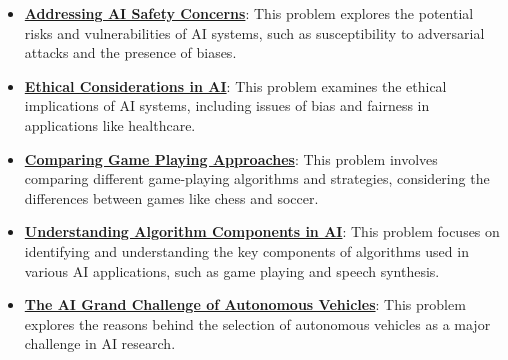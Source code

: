 \documentclass{article}%
\begin{document}
\begin{itemize}[leftmargin=*]
\item \href{\url{https://purdue.brightspace.com/d2l/common/assets/pdfjs-d2l-dist/1.0.14-legacy/web/viewer.html?file=\%252Fcontent\%252Fenforced\%252F1095467-wl.202510.CS.24300.001\%252F02L2-Intro.pdf\%253Fou\%253D1095467\&lang=en-us\&container=d2l-fileviewer-rendered-pdf\&fullscreen=d2l-fileviewer-rendered-pdf-dialog\&height=667}#page=19}{\textbf{Addressing AI Safety Concerns}}: This problem explores the potential risks and vulnerabilities of AI systems, such as susceptibility to adversarial attacks and the presence of biases.%
\item \href{\url{https://purdue.brightspace.com/d2l/common/assets/pdfjs-d2l-dist/1.0.14-legacy/web/viewer.html?file=\%252Fcontent\%252Fenforced\%252F1095467-wl.202510.CS.24300.001\%252F02L2-Intro.pdf\%253Fou\%253D1095467\&lang=en-us\&container=d2l-fileviewer-rendered-pdf\&fullscreen=d2l-fileviewer-rendered-pdf-dialog\&height=667}#page=20}{\textbf{Ethical Considerations in AI}}: This problem examines the ethical implications of AI systems, including issues of bias and fairness in applications like healthcare.%
\item \href{\url{https://purdue.brightspace.com/d2l/common/assets/pdfjs-d2l-dist/1.0.14-legacy/web/viewer.html?file=\%252Fcontent\%252Fenforced\%252F1095467-wl.202510.CS.24300.001\%252F02L2-Intro.pdf\%253Fou\%253D1095467\&lang=en-us\&container=d2l-fileviewer-rendered-pdf\&fullscreen=d2l-fileviewer-rendered-pdf-dialog\&height=667}#page=27}{\textbf{Comparing Game Playing Approaches}}: This problem involves comparing different game-playing algorithms and strategies, considering the differences between games like chess and soccer.%
\item \href{\url{https://purdue.brightspace.com/d2l/common/assets/pdfjs-d2l-dist/1.0.14-legacy/web/viewer.html?file=\%252Fcontent\%252Fenforced\%252F1095467-wl.202510.CS.24300.001\%252F02L2-Intro.pdf\%253Fou\%253D1095467\&lang=en-us\&container=d2l-fileviewer-rendered-pdf\&fullscreen=d2l-fileviewer-rendered-pdf-dialog\&height=667}#page=24}{\textbf{Understanding Algorithm Components in AI}}: This problem focuses on identifying and understanding the key components of algorithms used in various AI applications, such as game playing and speech synthesis.%
\item \href{\url{https://purdue.brightspace.com/d2l/common/assets/pdfjs-d2l-dist/1.0.14-legacy/web/viewer.html?file=\%252Fcontent\%252Fenforced\%252F1095467-wl.202510.CS.24300.001\%252F02L2-Intro.pdf\%253Fou\%253D1095467\&lang=en-us\&container=d2l-fileviewer-rendered-pdf\&fullscreen=d2l-fileviewer-rendered-pdf-dialog\&height=667}#page=43}{\textbf{The AI Grand Challenge of Autonomous Vehicles}}: This problem explores the reasons behind the selection of autonomous vehicles as a major challenge in AI research.%

\end{itemize}
\end{document}
